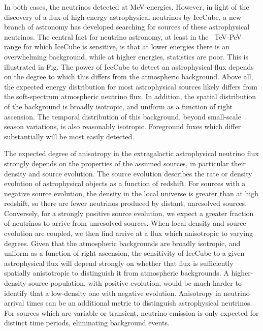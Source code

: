 \documentclass[]{article}
\begin{document}
In both cases, the neutrinos detected at MeV-energies.  However, in light of the discovery of a flux of high-energy astrophysical neutrinos by IceCube, a new branch of astronomy has developed searching for sources of these astrophysical neutrinos. The central fact for neutrino astronomy, at least in the ~TeV-PeV range for which IceCube is sensitive, is that at lower energies there is an overwhelming background, while at higher energies, statistics are poor. This is illustrated in Fig. The power of IceCube to detect an astrophysical flux depends on the degree to which this differs from the atmospheric background. Above all, the expected energy distribution for most astrophysical sources likely differs from the soft-spectrum atmospheric neutrino flux. In addition, the spatial distribution of the background is broadly isotropic, and uniform as a function of right ascension. The temporal distribution of this background, beyond small-scale season variations, is also reasonably isotropic. Foreground fuxes which differ substantially will be most easily detected.

The expected degree of anisotropy in the extragalactic astrophysical neutrino flux strongly depends on the properties of the assumed sources, in particular their density and source evolution. The source evolution describes the rate or density evolution of astrophysical objects as a function of redshift. For sources with a negative source evolution, the density in the local universe is greater than at high redshift, so there are fewer neutrinos produced by distant, unresolved sources. Conversely, for a strongly positive source evolution, we expect a greater fraction of neutrinos to arrive from unresolved sources. When local density and source evolution are coupled, we then find arrive at a flux which anisotropic to varying degrees. Given that the atmospheric backgrounds are broadly isotropic, and uniform as a function of right ascension, the sensitivity of IceCube to a given astrophysical flux will depend strongly on whether that flux is sufficiently spatially anistotropic to distinguish it from atmospheric backgrounds. A higher-density source population, with positive evolution, would be much harder to identify that a low-density one with negative evolution. Anisotropy in neutrino arrival times can be an additional metric to distinguish astrophysical neutrinos. For sources which are variable or transient, neutrino emission is only expected for distinct time periods, eliminating background events.
\end{document}
